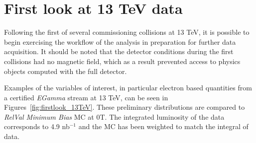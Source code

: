 \clearpage
\section{First look at 13 TeV data\label{app:firstlook13TeV}}

Following the first of several commissioning collisions at 13 TeV, it is possible to begin exercising
the workflow of the analysis in preparation for further data acquisition. 
It should be noted that the detector conditions during the first collisions had no magnetic field, which as a result prevented access to physics objects computed with the full detector.

Examples of the variables of interest, in particular electron based quantities from a certified {\textit{EGamma}} stream at 13 TeV, can be seen in Figures~\ref{fig:firstlook_13TeV}.
These preliminary distributions are compared to {\textit{RelVal Minimum Bias}} MC at 0T.
The integrated luminosity of the data corresponds to 4.9 nb$^{-1}$ and the MC has been weighted to match the integral of data. 


